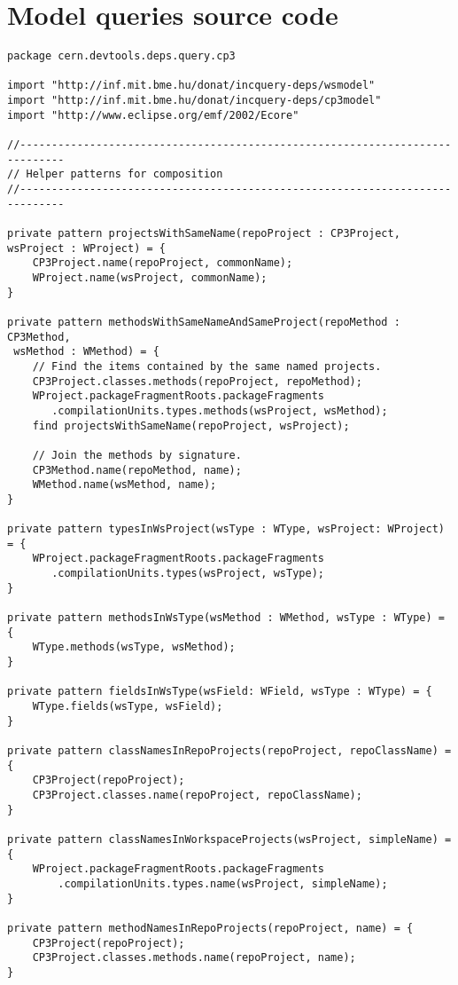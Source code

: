 \chapter{Model queries source code}
\label{examplequeries}



\begin{lstlisting}
package cern.devtools.deps.query.cp3

import "http://inf.mit.bme.hu/donat/incquery-deps/wsmodel"
import "http://inf.mit.bme.hu/donat/incquery-deps/cp3model"
import "http://www.eclipse.org/emf/2002/Ecore"

//-----------------------------------------------------------------------------
// Helper patterns for composition
//-----------------------------------------------------------------------------

private pattern projectsWithSameName(repoProject : CP3Project, wsProject : WProject) = {
	CP3Project.name(repoProject, commonName);
	WProject.name(wsProject, commonName);
}

private pattern methodsWithSameNameAndSameProject(repoMethod : CP3Method, 
 wsMethod : WMethod) = {
	// Find the items contained by the same named projects.
	CP3Project.classes.methods(repoProject, repoMethod);
	WProject.packageFragmentRoots.packageFragments
	   .compilationUnits.types.methods(wsProject, wsMethod);
	find projectsWithSameName(repoProject, wsProject);

	// Join the methods by signature.
	CP3Method.name(repoMethod, name);
	WMethod.name(wsMethod, name);
}

private pattern typesInWsProject(wsType : WType, wsProject: WProject) = {
	WProject.packageFragmentRoots.packageFragments
	   .compilationUnits.types(wsProject, wsType);
}

private pattern methodsInWsType(wsMethod : WMethod, wsType : WType) = {
	WType.methods(wsType, wsMethod);	
}

private pattern fieldsInWsType(wsField: WField, wsType : WType) = {
	WType.fields(wsType, wsField);	
}

private pattern classNamesInRepoProjects(repoProject, repoClassName) = {
	CP3Project(repoProject);
	CP3Project.classes.name(repoProject, repoClassName);
}

private pattern classNamesInWorkspaceProjects(wsProject, simpleName) = {
	WProject.packageFragmentRoots.packageFragments
	    .compilationUnits.types.name(wsProject, simpleName);
}

private pattern methodNamesInRepoProjects(repoProject, name) = {
	CP3Project(repoProject);
	CP3Project.classes.methods.name(repoProject, name);
}


\end{lstlisting}
